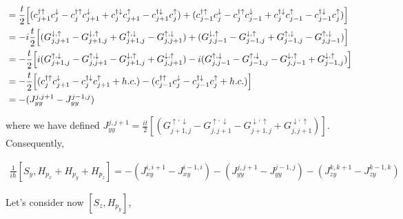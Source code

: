 \documentclass[10pt,prb,showpacs,amssymb,floatfix]{revtex4-1}
\newcommand{\dg}{\dagger}
\newcommand{\dna}{\downarrow}
\newcommand{\nn}{\nonumber}
\newcommand{\upa}{\uparrow}
\begin{document}
\begin{align}
 &= \frac{t}{2} \Big{[}(  c_{j+1}^{\dg\upa} c_{j}^{\dna} - c_{j}^{\dg\upa} c_{j+1}^{\dna} + c_{j}^{\dg\dna} c_{j+1}^{\upa}  - c_{j+1}^{\dg\dna} c_{j}^{\upa}) + (  c_{j-1}^{\dg\upa} c_{j}^{\dna}  - c_{j}^{\dg\upa} c_{j-1}^{\dna} + c_{j}^{\dg\dna} c_{j-1}^{\upa}  - c_{j-1}^{\dg\dna} c_{j}^{\upa})   \Big{]} \nn\\
 &=  -i\frac{t}{2} \Big{[}(  G_{j,j+1}^{\dna,\upa}  - G_{j+1,j}^{\dna,\upa} +  G_{j+1,j}^{\upa,\dna}   -  G_{j,j+1}^{\upa,\dna}) + (   G_{j,j-1}^{\dna,\upa}  - G_{j-1,j}^{\dna,\upa}+ G_{j-1,j}^{\upa,\dna}  - G_{j,j-1}^{\upa,\dna})   \Big{]} \nn\\
 & =  -\frac{t}{2} \Big{[}i(    G_{j+1,j}^{\upa,\dna}   -  G_{j,j+1}^{\upa,\dna}  - G_{j+1,j}^{\dna,\upa} + G_{j,j+1}^{\dna,\upa}  ) - i ( G_{j,j-1}^{\upa,\dna} - G_{j-1,j}^{\upa,\dna} -  G_{j,j-1}^{\dna,\upa}  + G_{j-1,j}^{\dna,\upa} )   \Big{]} \nn\\
 &=  -\frac{t}{2} \Big{[}(   c_{j}^{\dg\upa} c_{j+1}^{\dna} - c_{j}^{\dg\dna} c_{j+1}^{\upa}  + h.c. ) - (  c_{j-1}^{\dg\upa} c_{j}^{\dna}  - c_{j-1}^{\dg\dna} c_{j}^{\upa} + h.c.)   \Big{]} \nn\\
 &= - (J^{j,j+1}_{yy} - J^{j-1,j}_{yy})
\end{align}

where we have defined $J^{j,j+1}_{yy} = \frac{it}{2} [(    G_{j+1,j}^{\upa,\dna}   -  G_{j,j+1}^{\upa,\dna}  - G_{j+1,j}^{\dna,\upa} + G_{j,j+1}^{\dna,\upa}  ) ]$. Consequently,

\begin{align}
\frac{1}{i\hbar}[S_y,H_{p_x} + H_{p_y}  + H_{p_z} ] = -(J^{i,i+1}_{xy} - J^{i-1,i}_{xy}) -(J^{j,j+1}_{yy} - J^{j-1,j}_{yy})  -(J^{k,k+1}_{zy} - J^{k-1,k}_{zy}) 
\end{align}


Let's consider now $[S_z, H_{p_y}]$,
\end{document}
